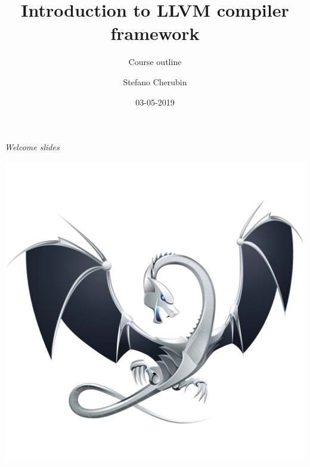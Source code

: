 \documentclass[10pt,mathserif]{beamer}
\author{Stefano Cherubin}
\institute{Politecnico di Milano}
\date{03-05-2019}
\title{Introduction to LLVM compiler framework}
\subtitle{Course outline}
\begin{document}
\begin{frame}
\maketitle
\begin{center}
\itshape\scriptsize Welcome slides
\end{center}
\end{frame}

\begin{frame}[plain]{}
  \begin{center}
    \vspace{-.1\textheight}
    \includegraphics[width=\textwidth]{img/00/logo.png}
  \end{center}
\end{frame}
\end{document}
